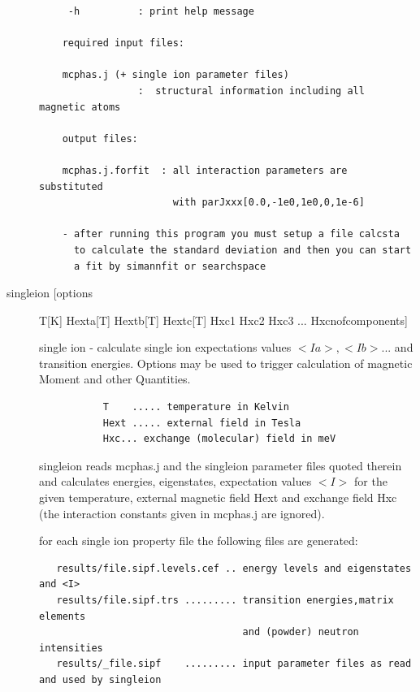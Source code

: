 \begin{description}
\begin{verbatim}
     -h          : print help message

    required input files:

    mcphas.j (+ single ion parameter files)
                 :  structural information including all magnetic atoms

    output files:

    mcphas.j.forfit  : all interaction parameters are substituted
                       with parJxxx[0.0,-1e0,1e0,0,1e-6]

    - after running this program you must setup a file calcsta 
      to calculate the standard deviation and then you can start
      a fit by simannfit or searchspace
\end{verbatim}
\item [\prg singleion\index{singleion} [options] T[K] Hexta[T] Hextb[T] Hextc[T] Hxc1 Hxc2 Hxc3 ... Hxcnofcomponents]
 single ion  - calculate single ion expectations values $<Ia>, <Ib> $... and transition energies.
 Options may be used to trigger calculation of magnetic Moment and other Quantities.
\begin{verbatim} 
           T    ..... temperature in Kelvin
           Hext ..... external field in Tesla 
           Hxc... exchange (molecular) field in meV   
\end{verbatim}
{\prg singleion} reads {\prg mcphas.j} and the singleion parameter files quoted therein
and calculates energies, eigenstates, expectation values $<I>$ for the given
temperature, external magnetic field Hext and exchange field Hxc (the
interaction constants given in mcphas.j are ignored).

for each single ion property file the following files are generated:
\begin{verbatim}
   results/file.sipf.levels.cef .. energy levels and eigenstates and <I>
   results/file.sipf.trs ......... transition energies,matrix elements
                                   and (powder) neutron intensities
   results/_file.sipf    ......... input parameter files as read and used by singleion 


\end{verbatim}
\end{description}

